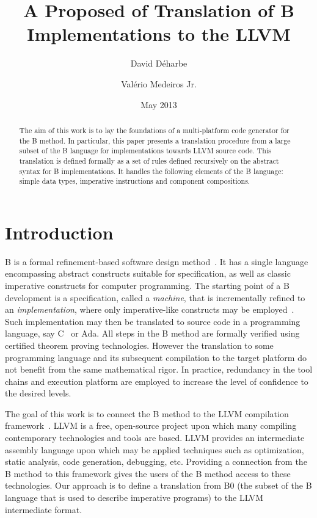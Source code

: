 \documentclass{llncs}
\title{A Proposed of Translation of B Implementations to the LLVM}
\author{David D\'{e}harbe \inst{1} \and Val\'{e}rio Medeiros Jr.\inst{2}}
\institute{Federal University of Rio Grande do Norte, UFRN, Brazil\\
\and 
Federal Institute of Education, Science and Technology  of Rio Grande do Norte, IFRN, Brazil}
\date{May 2013}
\begin{document}
\maketitle

\begin{abstract}
  The aim of this work is to lay the foundations of a multi-platform code
  generator for the B method. In particular, this paper presents a translation
  procedure from a large subset of the B language for implementations towards
  LLVM source code. This translation is defined formally as a set of rules
  defined recursively on the abstract syntax for B implementations. It handles
  the following elements of the B language: simple data types, imperative
  instructions and component compositions. 
\end{abstract}

\section{Introduction}

B is a formal refinement-based software design method~\cite{Abrial1996}. It has
a single language encompassing abstract constructs suitable for specification,
as well as classic imperative constructs for computer programming. The starting
point of a B development is a specification, called a \emph{machine}, that is
incrementally refined to an \emph{implementation}, where only imperative-like
constructs may be employed~\cite{Clearsy}. Such implementation may then be
translated to source code in a programming language, say C~\cite{ComenC} or
Ada. All steps in the B method are formally verified using certified theorem
proving technologies. However the translation to some programming language and
its subsequent compilation to the target platform do not benefit from the same
mathematical rigor. In practice, redundancy in the tool chains and execution
platform are employed to increase the level of confidence to the desired levels.

The goal of this work is to connect the B method to the LLVM compilation
framework~\cite{Lattner04LLVM}.  LLVM is a free, open-source project upon which
many compiling contemporary technologies and tools are based. LLVM provides an
intermediate assembly language upon which may be applied techniques such as
optimization, static analysis, code generation, debugging, etc. Providing a
connection from the B method to this framework gives the users of the B method
access to these technologies. Our approach is to define a translation from B0
(the subset of the B language that is used to describe imperative programs) to
the LLVM intermediate format.
\end{document}
